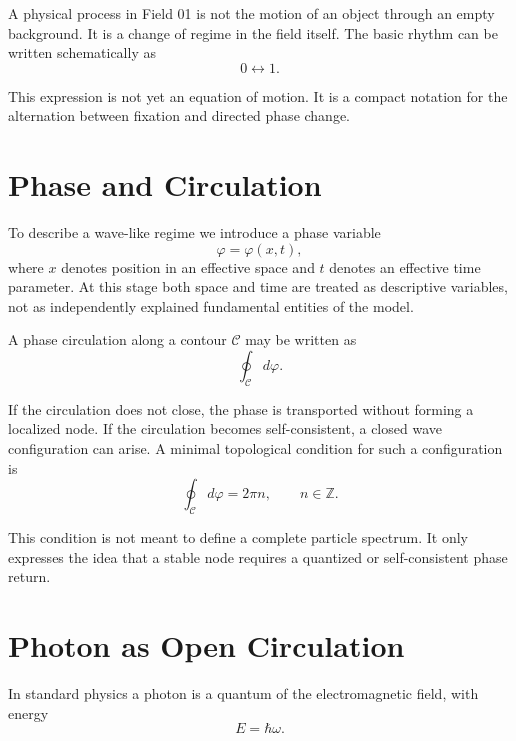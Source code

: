 \documentclass[11pt,a4paper]{article}
\newcommand{\phase}{\varphi}
\newcommand{\contour}{\mathcal{C}}
\begin{document}
A physical process in Field 01 is not the motion of an object through an empty background. It is a change of regime in the field itself. The basic rhythm can be written schematically as
\begin{equation}
0 \leftrightarrow 1.
\end{equation}

This expression is not yet an equation of motion. It is a compact notation for the alternation between fixation and directed phase change.

\section{Phase and Circulation}

To describe a wave-like regime we introduce a phase variable
\begin{equation}
\phase = \phase(x,t),
\end{equation}
where $x$ denotes position in an effective space and $t$ denotes an effective time parameter. At this stage both space and time are treated as descriptive variables, not as independently explained fundamental entities of the model.

A phase circulation along a contour $\contour$ may be written as
\begin{equation}
\oint_{\contour} d\phase.
\end{equation}

If the circulation does not close, the phase is transported without forming a localized node. If the circulation becomes self-consistent, a closed wave configuration can arise. A minimal topological condition for such a configuration is
\begin{equation}
\oint_{\contour} d\phase = 2\pi n, \qquad n \in \mathbb{Z}.
\end{equation}

This condition is not meant to define a complete particle spectrum. It only expresses the idea that a stable node requires a quantized or self-consistent phase return.

\section{Photon as Open Circulation}

In standard physics a photon is a quantum of the electromagnetic field, with energy
\begin{equation}
E = \hbar\omega.
\end{equation}
\end{document}
